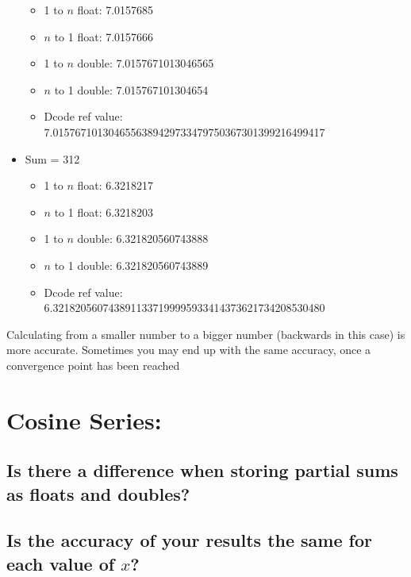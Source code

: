 \documentclass[12pt]{article}
\begin{document}
\begin{itemize}
\begin{itemize}
\item 1 to $n$ float: 7.0157685
\item $n$ to 1 float: 7.0157666
\\
\item 1 to $n$ double: 7.0157671013046565
\item $n$ to 1 double: 7.015767101304654
\\
\item Dcode ref value: 7.0157671013046556389429733479750367301399216499417
\end{itemize}
\item Sum = 312
\begin{itemize}
\item 1 to $n$ float: 6.3218217
\item $n$ to 1 float: 6.3218203
\\
\item 1 to $n$ double: 6.321820560743888
\item $n$ to 1 double: 6.321820560743889
\\
\item Dcode ref value: 6.3218205607438911337199995933414373621734208530480
\end{itemize}
\end{itemize}
\item Calculating from a smaller number to a bigger number (backwards in this case) is more accurate. Sometimes you may end up with the same accuracy, once a convergence point has been reached


\section*{Cosine Series:}

\begin{itemize}
\subsection*{Is there a difference when storing partial sums as floats and doubles?}

\subsection*{Is the accuracy of your results the same for each value of $x$?}

\end{itemize}
\end{document}
